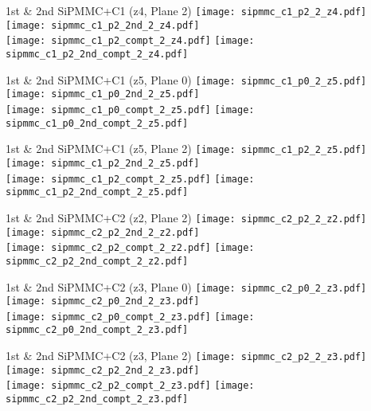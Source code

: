 \documentclass{beamer}
\begin{document}
\begin{frame}{1st \& 2nd SiPMMC+C1 (z4, Plane 2)}
	\texttt{[image: sipmmc\_c1\_p2\_2\_z4.pdf]}
	\texttt{[image: sipmmc\_c1\_p2\_2nd\_2\_z4.pdf]} \\
	
		\texttt{[image: sipmmc\_c1\_p2\_compt\_2\_z4.pdf]}
		\texttt{[image: sipmmc\_c1\_p2\_2nd\_compt\_2\_z4.pdf]}
\end{frame}

\begin{frame}{1st \& 2nd SiPMMC+C1 (z5, Plane 0)}
	\texttt{[image: sipmmc\_c1\_p0\_2\_z5.pdf]}
	\texttt{[image: sipmmc\_c1\_p0\_2nd\_2\_z5.pdf]} \\
	
		\texttt{[image: sipmmc\_c1\_p0\_compt\_2\_z5.pdf]}
		\texttt{[image: sipmmc\_c1\_p0\_2nd\_compt\_2\_z5.pdf]}
\end{frame}

\begin{frame}{1st \& 2nd SiPMMC+C1 (z5, Plane 2)}
	\texttt{[image: sipmmc\_c1\_p2\_2\_z5.pdf]}
	\texttt{[image: sipmmc\_c1\_p2\_2nd\_2\_z5.pdf]} \\
	
		\texttt{[image: sipmmc\_c1\_p2\_compt\_2\_z5.pdf]}
		\texttt{[image: sipmmc\_c1\_p2\_2nd\_compt\_2\_z5.pdf]}
\end{frame}

\begin{frame}{1st \& 2nd SiPMMC+C2 (z2, Plane 2)}
	\texttt{[image: sipmmc\_c2\_p2\_2\_z2.pdf]}
	\texttt{[image: sipmmc\_c2\_p2\_2nd\_2\_z2.pdf]} \\
	
		\texttt{[image: sipmmc\_c2\_p2\_compt\_2\_z2.pdf]}
		\texttt{[image: sipmmc\_c2\_p2\_2nd\_compt\_2\_z2.pdf]}
\end{frame}

\begin{frame}{1st \& 2nd SiPMMC+C2 (z3, Plane 0)}
	\texttt{[image: sipmmc\_c2\_p0\_2\_z3.pdf]}
	\texttt{[image: sipmmc\_c2\_p0\_2nd\_2\_z3.pdf]} \\
	
		\texttt{[image: sipmmc\_c2\_p0\_compt\_2\_z3.pdf]}
		\texttt{[image: sipmmc\_c2\_p0\_2nd\_compt\_2\_z3.pdf]}
\end{frame}

\begin{frame}{1st \& 2nd SiPMMC+C2 (z3, Plane 2)}
	\texttt{[image: sipmmc\_c2\_p2\_2\_z3.pdf]}
	\texttt{[image: sipmmc\_c2\_p2\_2nd\_2\_z3.pdf]} \\
	
		\texttt{[image: sipmmc\_c2\_p2\_compt\_2\_z3.pdf]}
		\texttt{[image: sipmmc\_c2\_p2\_2nd\_compt\_2\_z3.pdf]}
\end{frame}
\end{document}
